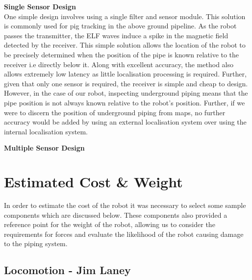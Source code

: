 \documentclass[11pt]{article}		%
\begin{document}
		\textbf{Single Sensor Design}\\
		One simple design involves using a single filter and sensor module. This solution is commonly used for pig tracking in the above ground pipeline. As the robot passes the transmitter, the ELF waves induce a spike in the magnetic field detected by the receiver. This simple solution allows the location of the robot to be precisely determined when the position of the pipe is known relative to the receiver i.e directly below it. Along with excellent accuracy, the method also allows extremely low latency as little localisation processing is required. Further, given that only one sensor is required, the receiver is simple and cheap to design. \\
    	\hspace*{3ex}However, in the case of our robot, inspecting underground piping means that the pipe position is not always known relative to the robot's position. Further, if we were to discern the position of underground piping from maps, no further accuracy would be added by using an external localisation system over using the internal localisation system. 

        \textbf{Multiple Sensor Design}
		
		
		
		
		
	\section{Estimated Cost \& Weight}
		
		In order to estimate the cost of the robot it was necessary to select some sample components which are discussed below.
		These components also provided a reference point for the weight of the robot, allowing us to consider the requirements for forces and evaluate the likelihood of the robot causing damage to the piping system.
		
		\subsection[Locomotion]{Locomotion - Jim Laney}
		
\end{document}
